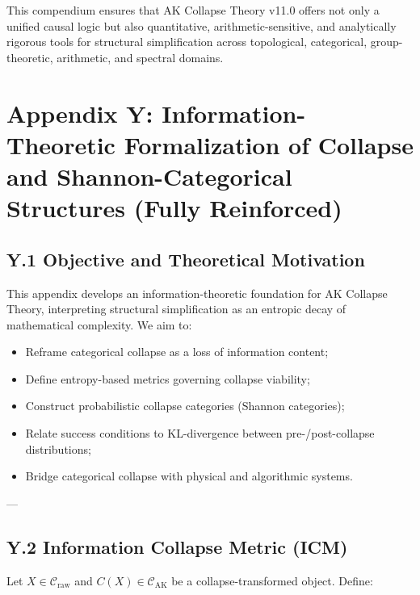 \documentclass[11pt]{article}
\begin{document}
This compendium ensures that AK Collapse Theory v11.0 offers not only a unified causal logic but also quantitative, arithmetic-sensitive, and analytically rigorous tools for structural simplification across topological, categorical, group-theoretic, arithmetic, and spectral domains.




\section*{Appendix Y: Information-Theoretic Formalization of Collapse and Shannon-Categorical Structures (Fully Reinforced)}

\subsection*{Y.1 Objective and Theoretical Motivation}

This appendix develops an information-theoretic foundation for AK Collapse Theory, interpreting structural simplification as an entropic decay of mathematical complexity. We aim to:

\begin{itemize}
    \item Reframe categorical collapse as a loss of information content;
    \item Define entropy-based metrics governing collapse viability;
    \item Construct probabilistic collapse categories (Shannon categories);
    \item Relate success conditions to KL-divergence between pre-/post-collapse distributions;
    \item Bridge categorical collapse with physical and algorithmic systems.
\end{itemize}

---

\subsection*{Y.2 Information Collapse Metric (ICM)}

Let \( X \in \mathcal{C}_{\mathrm{raw}} \) and \( C(X) \in \mathcal{C}_{\mathrm{AK}} \) be a collapse-transformed object. Define:
\end{document}
